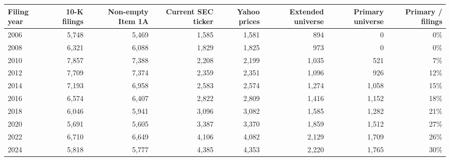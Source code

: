 \begin{tabular}{lrrrrrrr}
\toprule
Filing year & 10-K filings & Non-empty Item 1A & Current SEC ticker & Yahoo prices & Extended universe & Primary universe & Primary / filings \\
\midrule
2006 & 5{,}748 & 5{,}469 & 1{,}585 & 1{,}581 & 894 & 0 & 0\% \\
2008 & 6{,}321 & 6{,}088 & 1{,}829 & 1{,}825 & 973 & 0 & 0\% \\
2010 & 7{,}857 & 7{,}388 & 2{,}208 & 2{,}199 & 1{,}035 & 521 & 7\% \\
2012 & 7{,}709 & 7{,}374 & 2{,}359 & 2{,}351 & 1{,}096 & 926 & 12\% \\
2014 & 7{,}193 & 6{,}958 & 2{,}583 & 2{,}574 & 1{,}274 & 1{,}058 & 15\% \\
2016 & 6{,}574 & 6{,}407 & 2{,}822 & 2{,}809 & 1{,}416 & 1{,}152 & 18\% \\
2018 & 6{,}046 & 5{,}941 & 3{,}096 & 3{,}082 & 1{,}585 & 1{,}282 & 21\% \\
2020 & 5{,}691 & 5{,}605 & 3{,}387 & 3{,}370 & 1{,}859 & 1{,}512 & 27\% \\
2022 & 6{,}710 & 6{,}649 & 4{,}106 & 4{,}082 & 2{,}129 & 1{,}709 & 26\% \\
2024 & 5{,}818 & 5{,}777 & 4{,}385 & 4{,}353 & 2{,}220 & 1{,}765 & 30\% \\
\bottomrule
\end{tabular}
